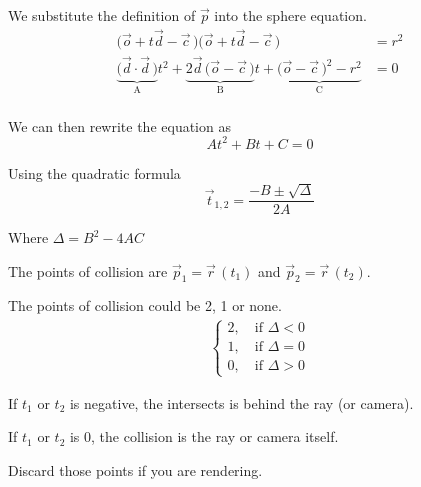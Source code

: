 \documentclass{article}
\begin{document}
We substitute the definition of \(\vec{p}\) into the sphere equation.
\begin{align*}
	\Big(\vec{o}+t\vec{d}-\vec{c}\,\Big)\Big(\vec{o}+t\vec{d}-\vec{c}\,\Big)&=r^2\\
	\underbrace{\Big(\vec{d}\cdot\vec{d}\,\Big)}_\text{A}t^2+
	\underbrace{2\vec{d}\,\Big(\vec{o}-\vec{c}\,\Big)}_\text{B}t+
	\underbrace{\Big(\vec{o}-\vec{c}\,\Big)^2-r^2}_\text{C}&=0\\
\end{align*}

We can then rewrite the equation as
\[
	At^2+Bt+C=0
\]

Using the quadratic formula
\[
	\vec{t}_{1,2}=\frac{-B\pm\sqrt{\Delta}}{2A}
\]

Where \(\Delta=B^2-4AC\)

The points of collision are \(\vec{p}_1=\vec{r}\,(t_1)\) and \(\vec{p}_2=\vec{r}\,(t_2)\).

The points of collision could be 2, 1 or none.
\begin{align*}
	\begin{cases}
		2,\quad\text{if }\Delta<0\\
		1,\quad\text{if }\Delta=0\\
		0,\quad\text{if }\Delta>0
	\end{cases}
\end{align*}

If \(t_1\) or \(t_2\) is negative, the intersects is behind the ray (or camera).

If \(t_1\) or \(t_2\) is \(0\), the collision is the ray or camera itself.

Discard those points if you are rendering.
\end{document}
